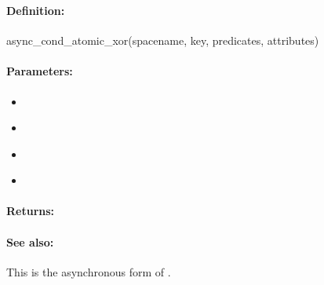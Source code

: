 \pagebreak
\subsubsection{}
\label{api:ruby:async_cond_atomic_xor}


\paragraph{Definition:}
\begin{rubycode}
async_cond_atomic_xor(spacename, key, predicates, attributes)
\end{rubycode}

\paragraph{Parameters:}
\begin{itemize}[noitemsep]
\item {}\\

\item {}\\

\item {}\\

\item {}\\

\end{itemize}

\paragraph{Returns:}


\paragraph{See also:}  This is the asynchronous form of .

\pagebreak
\subsubsection{}
\label{api:ruby:group_atomic_xor}



